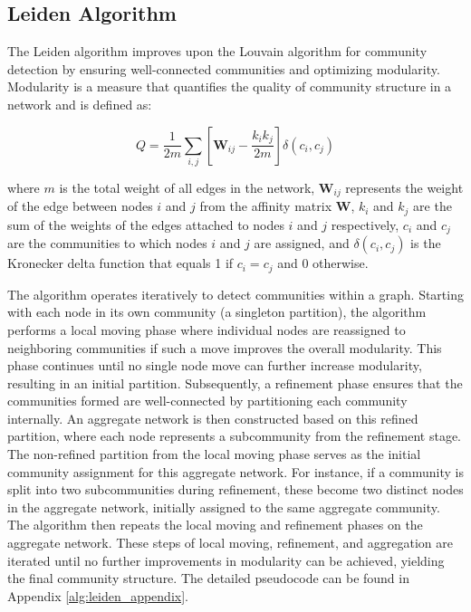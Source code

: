 \subsection{Leiden Algorithm}
\label{subsec:LeidenAlgorithm}

The Leiden algorithm improves upon the Louvain algorithm for community detection by ensuring well-connected communities and optimizing modularity. Modularity is a measure that quantifies the quality of community structure in a network and is defined as:

\begin{equation}
Q = \frac{1}{2m} \sum_{i,j} \left[ \mathbf{W}_{ij} - \frac{k_i k_j}{2m} \right] \delta(c_i, c_j)
\end{equation}

where $m$ is the total weight of all edges in the network, $\mathbf{W}_{ij}$ represents the weight of the edge between nodes $i$ and $j$ from the affinity matrix $\mathbf{W}$, $k_i$ and $k_j$ are the sum of the weights of the edges attached to nodes $i$ and $j$ respectively, $c_i$ and $c_j$ are the communities to which nodes $i$ and $j$ are assigned, and $\delta(c_i, c_j)$ is the Kronecker delta function that equals 1 if $c_i = c_j$ and 0 otherwise.

The algorithm operates iteratively to detect communities within a graph. Starting with each node in its own community (a singleton partition), the algorithm performs a local moving phase where individual nodes are reassigned to neighboring communities if such a move improves the overall modularity. This phase continues until no single node move can further increase modularity, resulting in an initial partition. Subsequently, a refinement phase ensures that the communities formed are well-connected by partitioning each community internally. An aggregate network is then constructed based on this refined partition, where each node represents a subcommunity from the refinement stage. The non-refined partition from the local moving phase serves as the initial community assignment for this aggregate network. For instance, if a community is split into two subcommunities during refinement, these become two distinct nodes in the aggregate network, initially assigned to the same aggregate community. The algorithm then repeats the local moving and refinement phases on the aggregate network. These steps of local moving, refinement, and aggregation are iterated until no further improvements in modularity can be achieved, yielding the final community structure. The detailed pseudocode can be found in Appendix \ref{alg:leiden_appendix}.

